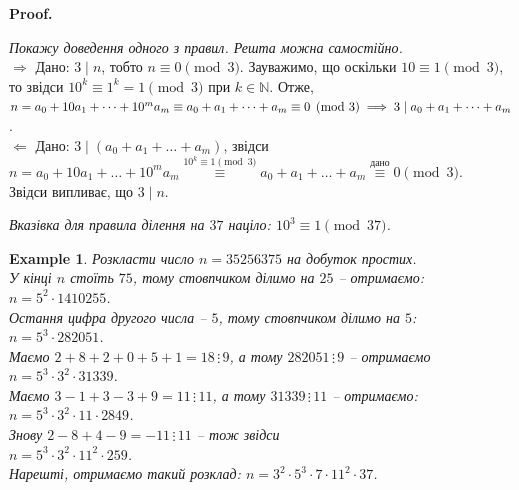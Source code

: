 \documentclass[a4paper, 10pt]{article}
\makeatletter
\theoremstyle{theoremdd}
\theoremstyle{theoremdd}
\theoremstyle{theoremdd}
\theoremstyle{theoremdd}
\newtheorem{example}[theorem]{Example}
\theoremstyle{theoremdd}
\theoremstyle{theoremdd}
\theoremstyle{theoremdd}
\theoremstyle{theoremdd}
\def\rightproof{$\boxed{\Rightarrow}$ }
\def\leftproof{$\boxed{\Leftarrow}$ }
\renewenvironment{proof}[1][Proof.\\]{\par
\pushQED{\hfill \qed}%
\normalfont \topsep6\p@\@plus6\p@\relax
\trivlist
\item\relax
{\bfseries
#1\@addpunct{.}}\hspace\labelsep\ignorespaces
}{%
\popQED\endtrivlist\@endpefalse
}
\makeatother
\begin{document}
\begin{proof}
\textit{Покажу доведення одного з правил. Решта можна самостійно.}\\
\rightproof Дано: $3 \mid n$, тобто $n \equiv 0 \pmod 3$. Зауважимо, що оскільки $10 \equiv 1 \pmod 3$, то звідси $10^k \equiv 1^k = 1 \pmod 3$ при $k \in \mathbb{N}$. Отже,\\
$n = a_0 + 10a_1 + \dots + 10^m a_m \equiv a_0 + a_1 + \dots + a_m \equiv 0 \pmod 3 \\ \implies 3 \mid a_0 + a_1 + \dots + a_m$.
\bigskip \\
\leftproof Дано: $3 \mid (a_0 + a_1 + \dots + a_m)$, звідси\\
$n = a_0 + 10 a_1 + \dots + 10^m a_m \overset{10^k \equiv 1 \pmod 3}{\equiv} a_0 + a_1 + \dots + a_m \overset{\text{дано}}{\equiv} 0 \pmod 3$.\\
Звідси випливає, що $3 \mid n$.
\end{proof}

\textit{Вказівка для правила ділення на $37$ націло: $10^3 \equiv 1 \pmod {37}$.}

\begin{example}
Розкласти число $n = 35256375$ на добуток простих.\\
У кінці $n$ стоїть $75$, тому стовпчиком ділимо на $25$ -- отримаємо:\\
$n = 5^2 \cdot 1410255$.\\
Остання цифра другого числа -- $5$, тому стовпчиком ділимо на $5$:\\
$n = 5^3 \cdot 282051$.\\
Маємо $2+8+2+0+5+1 =18 \, \vdots \, 9$, а тому $282051 \, \vdots \, 9$ -- отримаємо\\
$n = 5^3 \cdot 3^2 \cdot 31339$.\\
Маємо $3-1+3-3+9 = 11 \, \vdots \, 11$, а тому $31339 \, \vdots \, 11$ -- отримаємо:\\
$n = 5^3 \cdot 3^2 \cdot 11 \cdot 2849$.\\
Знову $2-8+4-9 = -11 \, \vdots \, 11$ -- тож звідси\\
$n = 5^3 \cdot 3^2 \cdot 11^2 \cdot 259$.\\
Нарешті, отримаємо такий розклад: $n = 3^2 \cdot 5^3 \cdot 7 \cdot 11^2 \cdot 37$.
\end{example}
\end{document}
